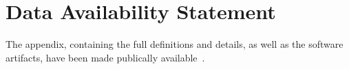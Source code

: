 \section*{Data Availability Statement}
The appendix, containing the full definitions and details, as well as the software artifacts, have been made publically available~\cite{artifact}.
